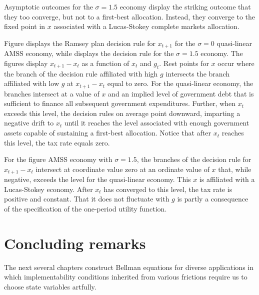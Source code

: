 Asymptotic outcomes  for the $\sigma = 1.5$ economy display the striking outcome that they too converge, but not to a first-best allocation.  Instead, they converge to the
fixed point in $x$  associated with a Lucas-Stokey complete markets allocation.

Figure  displays the Ramsey plan decision rule for $x_{t+1}$  for the $\sigma=0$ quasi-linear AMSS economy,  while  displays
 the decision rule for the $\sigma =1.5$ economy.  The figures display $x_{t+1} - x_t$ as a function of $x_t$ and $g_t$.   Rest points  for $x$ occur where the branch of
the decision rule affiliated with  high $g$ intersects the branch affiliated with low $g$ at  $x_{t+1} - x_t$ equal to zero.
For the quasi-linear economy, the branches intersect at a value of  $x$ and an implied
level of government debt that is sufficient to finance all subsequent government expenditures. Further, when
$x_t$ exceeds this level,  the decision rules on average point downward, imparting a negative drift to $x_t$ until it reaches the level associated with enough
government assets capable of sustaining a first-best allocation.  Notice that after $x_t$ reaches this level,  the tax rate equals zero.


For the figure  AMSS economy with $\sigma=1.5$, the branches of the decision rule for $x_{t+1} -x_t$ intersect at coordinate  value  zero at an ordinate value of $x$ that,
while negative, exceeds the
level for the quasi-linear  economy.  This $x$ is affiliated with a Lucas-Stokey economy.  After $x_t$ has converged to this level,
the tax rate is positive and constant. That it does not fluctuate
with $g$ is partly a consequence of the specification of the one-period utility function.

\section{Concluding remarks}

The next several chapters  construct Bellman equations for diverse applications in which  implementability conditions inherited from various frictions  require
us to choose state variables artfully.


